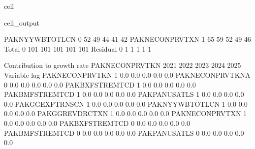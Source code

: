\documentclass[letterpaper,10pt,english]{jupyterBook}
\begin{document}
\begin{sphinxuseclass}{cell}
\begin{sphinxVerbatimOutput}
\begin{sphinxuseclass}{cell_output}
\begin{sphinxVerbatim}[commandchars=\\\{\}]
PAKNYYWBTOTLCN    0         \PYGZhy{}52\PYGZpc{}        \PYGZhy{}49\PYGZpc{}        \PYGZhy{}44\PYGZpc{}        \PYGZhy{}41\PYGZpc{}        \PYGZhy{}42\PYGZpc{}
PAKNECONPRVTXN   \PYGZhy{}1         \PYGZhy{}65\PYGZpc{}        \PYGZhy{}59\PYGZpc{}        \PYGZhy{}52\PYGZpc{}        \PYGZhy{}49\PYGZpc{}        \PYGZhy{}46\PYGZpc{}
Total             0         101\PYGZpc{}        101\PYGZpc{}        101\PYGZpc{}        101\PYGZpc{}        101\PYGZpc{}
Residual          0           1\PYGZpc{}          1\PYGZpc{}          1\PYGZpc{}          1\PYGZpc{}          1\PYGZpc{}

 Contribution to growth rate PAKNECONPRVTKN
                            2021        2022        2023        2024        2025
Variable         lag                                                            
PAKNECONPRVTKN   \PYGZhy{}1         0.0\PYGZpc{}        0.0\PYGZpc{}        0.0\PYGZpc{}        0.0\PYGZpc{}        0.0\PYGZpc{}
PAKNECONPRVTKN\PYGZus{}A  0        \PYGZhy{}0.0\PYGZpc{}       \PYGZhy{}0.0\PYGZpc{}       \PYGZhy{}0.0\PYGZpc{}       \PYGZhy{}0.0\PYGZpc{}       \PYGZhy{}0.0\PYGZpc{}
PAKBXFSTREMTCD   \PYGZhy{}1        \PYGZhy{}0.0\PYGZpc{}       \PYGZhy{}0.0\PYGZpc{}       \PYGZhy{}0.0\PYGZpc{}       \PYGZhy{}0.0\PYGZpc{}       \PYGZhy{}0.0\PYGZpc{}
PAKBMFSTREMTCD   \PYGZhy{}1         0.0\PYGZpc{}        0.0\PYGZpc{}        0.0\PYGZpc{}        0.0\PYGZpc{}        0.0\PYGZpc{}
PAKPANUSATLS     \PYGZhy{}1         0.0\PYGZpc{}        0.0\PYGZpc{}        0.0\PYGZpc{}        0.0\PYGZpc{}        0.0\PYGZpc{}
PAKGGEXPTRNSCN   \PYGZhy{}1        \PYGZhy{}0.0\PYGZpc{}       \PYGZhy{}0.0\PYGZpc{}       \PYGZhy{}0.0\PYGZpc{}       \PYGZhy{}0.0\PYGZpc{}       \PYGZhy{}0.0\PYGZpc{}
PAKNYYWBTOTLCN   \PYGZhy{}1        \PYGZhy{}0.0\PYGZpc{}       \PYGZhy{}0.0\PYGZpc{}       \PYGZhy{}0.0\PYGZpc{}       \PYGZhy{}0.0\PYGZpc{}       \PYGZhy{}0.0\PYGZpc{}
PAKGGREVDRCTXN   \PYGZhy{}1        \PYGZhy{}0.0\PYGZpc{}       \PYGZhy{}0.0\PYGZpc{}       \PYGZhy{}0.0\PYGZpc{}       \PYGZhy{}0.0\PYGZpc{}       \PYGZhy{}0.0\PYGZpc{}
PAKNECONPRVTXN   \PYGZhy{}1         0.0\PYGZpc{}        0.0\PYGZpc{}        0.0\PYGZpc{}        0.0\PYGZpc{}        0.0\PYGZpc{}
PAKBXFSTREMTCD    0         0.0\PYGZpc{}        0.0\PYGZpc{}        0.0\PYGZpc{}        0.0\PYGZpc{}        0.0\PYGZpc{}
PAKBMFSTREMTCD    0        \PYGZhy{}0.0\PYGZpc{}       \PYGZhy{}0.0\PYGZpc{}       \PYGZhy{}0.0\PYGZpc{}       \PYGZhy{}0.0\PYGZpc{}       \PYGZhy{}0.0\PYGZpc{}
PAKPANUSATLS      0        \PYGZhy{}0.0\PYGZpc{}       \PYGZhy{}0.0\PYGZpc{}       \PYGZhy{}0.0\PYGZpc{}       \PYGZhy{}0.0\PYGZpc{}       \PYGZhy{}0.0\PYGZpc{}

\end{sphinxVerbatim}
\end{sphinxuseclass}
\end{sphinxVerbatimOutput}
\end{sphinxuseclass}
\end{document}
